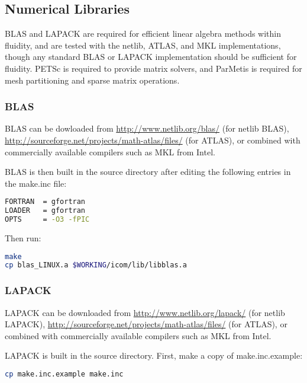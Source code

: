 \subsection{Numerical Libraries}
\label{sect:required_libraries_numerical}

BLAS and LAPACK are required for efficient linear algebra methods within
fluidity, and are tested with the netlib, ATLAS, and MKL implementations, though
any standard BLAS or LAPACK implementation should be sufficient for fluidity.
PETSc is required to provide matrix solvers, and ParMetis is required for mesh
partitioning and sparse matrix operations.

\subsubsection{BLAS}
\label{sect:required_libraries_numerical_blas}

BLAS can be dowloaded from \url{http://www.netlib.org/blas/} (for netlib BLAS),
\url{http://sourceforge.net/projects/math-atlas/files/} (for ATLAS), or
combined with commercially available compilers such as MKL from Intel.

BLAS is then built in the source directory after editing the following entries in the
make.inc file:

\begin{lstlisting}[language=bash]
FORTRAN  = gfortran
LOADER   = gfortran
OPTS     = -O3 -fPIC
\end{lstlisting}

Then run:

\begin{lstlisting}[language=bash]
make
cp blas_LINUX.a $WORKING/icom/lib/libblas.a
\end{lstlisting}

\subsubsection{LAPACK}
\label{sect:required_libraries_numerical_lapack}

LAPACK can be downloaded from \url{http://www.netlib.org/lapack/} (for netlib
LAPACK), \url{http://sourceforge.net/projects/math-atlas/files/} (for ATLAS),
or combined with commercially available compilers such as MKL from Intel. 

LAPACK is built in the source directory. First, make a copy of
make.inc.example:

\begin{lstlisting}[language=bash]
cp make.inc.example make.inc
\end{lstlisting}


